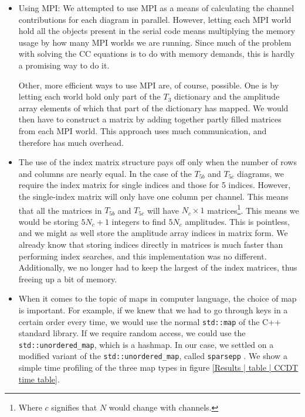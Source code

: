 \documentclass[10pt,twoside]{report}
\begin{document}
	\begin{itemize}
		\item Using MPI: We attempted to use MPI as a means of calculating the channel contributions for each diagram in parallel. However, letting each MPI world hold all the objects present in the serial code means multiplying the memory usage by how many MPI worlds we are running. Since much of the problem with solving the CC equations is to do with memory demands, this is hardly a promising way to do it.
		
		Other, more efficient ways to use MPI are, of course, possible. One is by letting each world hold only part of the $T_3$ dictionary and the amplitude array elements of which that part of the dictionary has mapped. We would then have to construct a matrix by adding together partly filled matrices from each MPI world. This approach uses much communication, and therefore has much overhead.
		
		\item The use of the index matrix structure pays off only when the number of rows and columns are nearly equal. In the case of the $T_{5b}$ and $T_{5c}$ diagrams, we require the index matrix for single indices and those for 5 indices. However, the single-index matrix will only have one column per channel. This means that all the matrices in $T_{5b}$ and $T_{5c}$ will have $N_c\times 1$ matrices\footnote{Where $c$ signifies that $N$ would change with channels.}. This means we would be storing $5N_c+1$ integers to find $5N_c$ amplitudes. This is pointless, and we might as well store the amplitude array indices in matrix form. We already know that storing indices directly in matrices is much faster than performing index searches, and this implementation was no different. Additionally, we no longer had to keep the largest of the index matrices, thus freeing up a bit of memory.
		
		\item When it comes to the topic of maps in computer language, the choice of map is important. For example, if we knew that we had to go through keys in a certain order every time, we would use the normal \texttt{std::map} of the C++ standard library. If we require random access, we could use the \texttt{std::unordered\_map}, which is a hashmap. In our case, we settled on a modified variant of the \texttt{std::unordered\_map}, called \texttt{sparsepp} \cite{sparsepp}. We show a simple time profiling of the three map types in figure \ref{Results | table | CCDT time table}.
		

\end{itemize}
\end{document}

